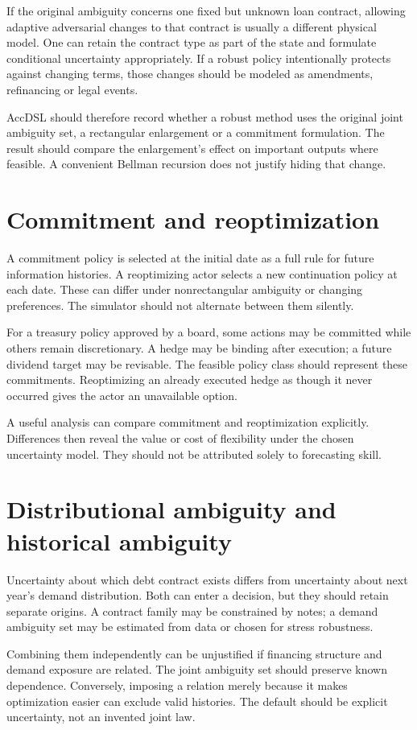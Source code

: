 If the original ambiguity concerns one fixed but unknown loan contract, allowing adaptive adversarial changes to that contract is usually a different physical model. One can retain the contract type as part of the state and formulate conditional uncertainty appropriately. If a robust policy intentionally protects against changing terms, those changes should be modeled as amendments, refinancing or legal events.

AccDSL should therefore record whether a robust method uses the original joint ambiguity set, a rectangular enlargement or a commitment formulation. The result should compare the enlargement's effect on important outputs where feasible. A convenient Bellman recursion does not justify hiding that change.

\section{Commitment and reoptimization}
A commitment policy is selected at the initial date as a full rule for future information histories. A reoptimizing actor selects a new continuation policy at each date. These can differ under nonrectangular ambiguity or changing preferences. The simulator should not alternate between them silently.

For a treasury policy approved by a board, some actions may be committed while others remain discretionary. A hedge may be binding after execution; a future dividend target may be revisable. The feasible policy class should represent these commitments. Reoptimizing an already executed hedge as though it never occurred gives the actor an unavailable option.

A useful analysis can compare commitment and reoptimization explicitly. Differences then reveal the value or cost of flexibility under the chosen uncertainty model. They should not be attributed solely to forecasting skill.

\section{Distributional ambiguity and historical ambiguity}
Uncertainty about which debt contract exists differs from uncertainty about next year's demand distribution. Both can enter a decision, but they should retain separate origins. A contract family may be constrained by notes; a demand ambiguity set may be estimated from data or chosen for stress robustness.

Combining them independently can be unjustified if financing structure and demand exposure are related. The joint ambiguity set should preserve known dependence. Conversely, imposing a relation merely because it makes optimization easier can exclude valid histories. The default should be explicit uncertainty, not an invented joint law.

